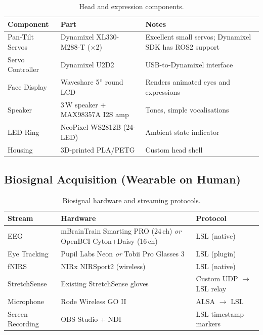 \documentclass[11pt,a4paper]{article}
\begin{document}
\begin{table}[H]
\centering
\caption{Head and expression components.}
\label{tab:head}
\begin{tabularx}{\textwidth}{llX}
\toprule
\textbf{Component} & \textbf{Part} & \textbf{Notes} \\
\midrule
Pan-Tilt Servos & Dynamixel XL330-M288-T ($\times$2) & Excellent small servos; Dynamixel SDK has ROS2 support \\
Servo Controller & Dynamixel U2D2 & USB-to-Dynamixel interface \\
Face Display & Waveshare 5'' round LCD & Renders animated eyes and expressions \\
Speaker & 3\,W speaker + MAX98357A I2S amp & Tones, simple vocalisations \\
LED Ring & NeoPixel WS2812B (24-LED) & Ambient state indicator \\
Housing & 3D-printed PLA/PETG & Custom head shell \\
\bottomrule
\end{tabularx}
\end{table}

\subsection{Biosignal Acquisition (Wearable on Human)}

\begin{table}[H]
\centering
\caption{Biosignal hardware and streaming protocols.}
\label{tab:biosignal}
\begin{tabularx}{\textwidth}{llX}
\toprule
\textbf{Stream} & \textbf{Hardware} & \textbf{Protocol} \\
\midrule
EEG & mBrainTrain Smarting PRO (24\,ch) \textit{or} OpenBCI Cyton+Daisy (16\,ch) & LSL (native) \\
Eye Tracking & Pupil Labs Neon \textit{or} Tobii Pro Glasses 3 & LSL (plugin) \\
fNIRS & NIRx NIRSport2 (wireless) & LSL (native) \\
StretchSense & Existing StretchSense gloves & Custom UDP $\rightarrow$ LSL relay \\
Microphone & Rode Wireless GO II & ALSA $\rightarrow$ LSL \\
Screen Recording & OBS Studio + NDI & LSL timestamp markers \\
\bottomrule
\end{tabularx}
\end{table}
\end{document}

